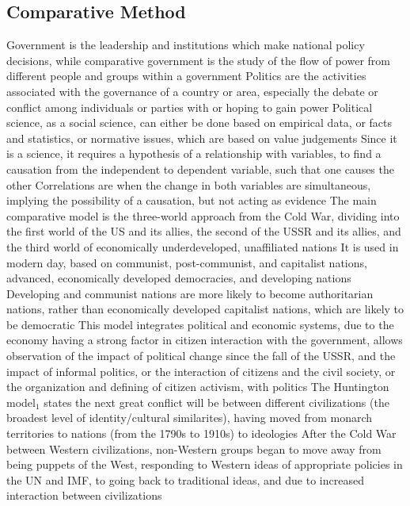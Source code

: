 \documentclass[11 pt, twoside]{article}
\newcommand{\foot}[1]{\hyperlink{#1}{$_#1$}}
\newenvironment{outline*}
{
	\begin{outline}[enumerate]
	}
	{\end{outline}
}
\begin{document}
\subsection{Comparative Method}
\begin{outline*}
\1 Government is the leadership and institutions which make national policy decisions, while comparative government is the study of the flow of power from different people and groups within a government
\2 Politics are the activities associated with the governance of a country or area, especially the debate or conflict among individuals or parties with or hoping to gain power
\1 Political science, as a social science, can either be done based on empirical data, or facts and statistics, or normative issues, which are based on value judgements
\2 Since it is a science, it requires a hypothesis of a relationship with variables, to find a causation from the independent to dependent variable, such that one causes the other
\2 Correlations are when the change in both variables are simultaneous, implying the possibility of a causation, but not acting as evidence
\1 The main comparative model is the three-world approach from the Cold War, dividing into the first world of the US and its allies, the second of the USSR and its allies, and the third world of economically underdeveloped, unaffiliated nations
\2 It is used in modern day, based on communist, post-communist, and capitalist nations, advanced, economically developed democracies, and developing nations
\2 Developing and communist nations are more likely to become authoritarian nations, rather than economically developed capitalist nations, which are likely to be democratic
\2 This model integrates political and economic systems, due to the economy having a strong factor in citizen interaction with the government, allows observation of the impact of political change since the fall of the USSR, and the impact of informal politics, or the interaction of citizens and the civil society, or the organization and defining of citizen activism, with politics
\1 The Huntington model\foot{1} states the next great conflict will be between different civilizations (the broadest level of identity/cultural similarites), having moved from monarch territories to nations (from the 1790s to 1910s) to ideologies
\2 After the Cold War between Western civilizations, non-Western groups began to move away from being puppets of the West, responding to Western ideas of appropriate policies in the UN and IMF, to going back to traditional ideas, and due to increased interaction between civilizations

\end{outline*}
\end{document}
